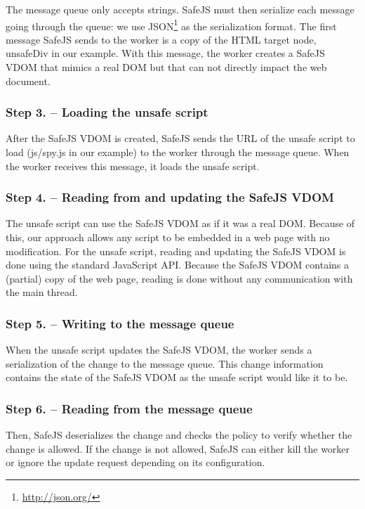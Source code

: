 \documentclass{article}
\newcommand{\ct}[1]{{\textsf{#1}}\xspace}
\newcommand{\js}{JavaScript\xspace}
\newcommand{\safejs}{SafeJS\xspace}
\newcommand{\dom}{DOM\xspace}
\newcommand{\vdom}{\safejs VDOM\xspace}
\begin{document}
The message queue only accepts strings. \safejs must then serialize
each message going through the queue: we use
JSON\footnote{\url{http://json.org/}} as the serialization format. The
first message \safejs sends to the worker is a copy of the HTML target
node, \ct{unsafeDiv} in our example. With this message, the worker
creates a \vdom that mimics a real \dom but that can not directly impact
the web document.

\subsubsection*{Step 3. -- Loading the unsafe script}

After the \vdom is created, \safejs sends the URL of the unsafe script
to load (\ct{js/spy.js} in our example) to the worker through the
message queue. When the worker receives this message, it loads the
unsafe script.

\subsubsection*{Step 4. -- Reading from and updating the \vdom}

The unsafe script can use the \vdom as if it was a real \dom. Because
of this, our approach allows any script to be embedded in a web page
with no modification. For the unsafe script, reading and updating the
\vdom is done using the standard \js API. Because the \vdom contains a
(partial) copy of the web page, reading is done without any
communication with the main thread.

\subsubsection*{Step 5. -- Writing to the message queue}

When the unsafe script updates the \vdom, the worker sends a
serialization of the change to the message queue. This change
information contains the state of the \vdom as the unsafe script would
like it to be.

\subsubsection*{Step 6. -- Reading from the message queue}

Then, \safejs deserializes the change and checks the policy to verify
whether the change is allowed. If the change is not allowed, \safejs
can either kill the worker or ignore the update request depending on
its configuration.
\end{document}
